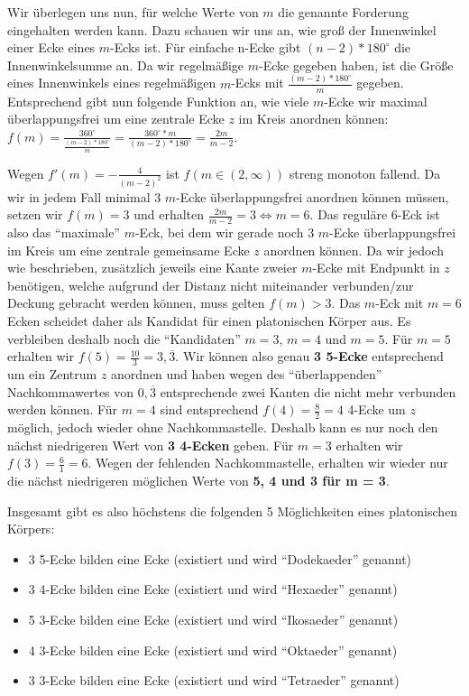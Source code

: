 \documentclass[a4paper]{article}
\begin{document}
Wir überlegen uns nun, für welche Werte von $m$ die genannte Forderung eingehalten 
werden kann. Dazu schauen wir uns an, wie groß der Innenwinkel einer Ecke 
eines $m$-Ecks ist. Für einfache n-Ecke gibt $(n-2)*180^{\circ}$ die Innenwinkelsumme an.
Da wir regelmäßige $m$-Ecke gegeben haben, ist die Größe eines Innenwinkels eines
regelmäßigen $m$-Ecks mit $\frac{(m-2)*180^{\circ}}{m}$ gegeben. Entsprechend gibt 
nun folgende Funktion an, wie viele $m$-Ecke wir maximal überlappungsfrei um eine zentrale Ecke $z$
im Kreis anordnen können: $f(m) = \frac{360^{\circ}}{\frac{(m-2)*180^{\circ}}{m}} = 
\frac{360^{\circ} * m}{(m-2) * 180^{\circ}} = \frac{2m}{m-2}$.

Wegen $f'(m) = -\frac{4}{(m-2)^2}$ ist $f(m \in (2,\infty))$ streng monoton fallend. 
Da wir in jedem Fall minimal 3 $m$-Ecke überlappungsfrei anordnen können müssen, 
setzen wir $f(m) = 3$ und erhalten $\frac{2m}{m-2} = 3 \Leftrightarrow m = 6$.
Das reguläre 6-Eck ist also das "`maximale"' $m$-Eck, bei dem wir gerade noch 3 
$m$-Ecke überlappungsfrei im Kreis um eine zentrale gemeinsame Ecke $z$ anordnen können.
Da wir jedoch wie beschrieben, zusätzlich jeweils eine Kante zweier $m$-Ecke
 mit Endpunkt in $z$ benötigen, welche aufgrund der Distanz nicht miteinander
 verbunden/zur Deckung gebracht werden können, muss gelten $f(m) > 3$.
 Das $m$-Eck mit $m = 6$ Ecken scheidet daher als Kandidat für einen platonischen Körper aus.
 Es verbleiben deshalb noch die "`Kandidaten"' $m = 3$, $m = 4$ und $m = 5$.
 Für $m = 5$ erhalten wir $f(5) = \frac{10}{3} = 3,\overline{3}$. Wir können also
 genau \textbf{3 5-Ecke} entsprechend um ein Zentrum $z$ anordnen und haben wegen des "`überlappenden"'
 Nachkommawertes von $0,\overline{3}$ entsprechende zwei Kanten die nicht mehr verbunden werden können.
 Für $m = 4$ sind entsprechend $f(4) = \frac{8}{2} = 4$ 4-Ecke um $z$ möglich, jedoch wieder ohne
 Nachkommastelle. Deshalb kann es nur noch den nächst niedrigeren Wert von \textbf{3 4-Ecken} geben.
 Für $m = 3$ erhalten wir $f(3) = \frac{6}{1} = 6$. Wegen der fehlenden Nachkommastelle, 
 erhalten wir wieder nur die nächst niedrigeren möglichen Werte von \textbf{5, 4 und 3 für m = 3}. 
 
 Insgesamt gibt es also höchstens die folgenden 5 Möglichkeiten eines platonischen Körpers:
 
 \begin{itemize}
 	\item 3 5-Ecke bilden eine Ecke  (existiert und wird "`Dodekaeder"' genannt)
 	\item 3 4-Ecke bilden eine Ecke  (existiert und wird "`Hexaeder"' genannt)
 	\item 5 3-Ecke bilden eine Ecke  (existiert und wird "`Ikosaeder"' genannt)
 	\item 4 3-Ecke bilden eine Ecke  (existiert und wird "`Oktaeder"' genannt)
 	\item 3 3-Ecke bilden eine Ecke  (existiert und wird "`Tetraeder"' genannt)
 \end{itemize}
 
\end{document}
